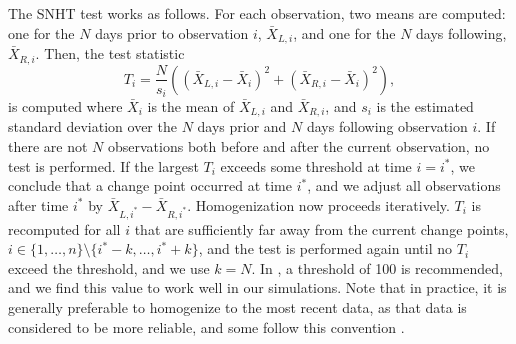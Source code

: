 \documentclass[12pt]{article}
\def\ni{\noindent}
\begin{document}
\begin{doublespacing}
The SNHT test works as follows.  For each observation, two means are computed: one for the $N$ days prior to observation $i$, $\bar{X}_{L,i}$, and one for the $N$ days following, $\bar{X}_{R,i}$.  Then, the test statistic
\begin{equation}
	T_i = \frac{N}{s_i}\left( (\bar{X}_{L,i}-\bar{X}_i)^2 + (\bar{X}_{R,i}-\bar{X}_i)^2\right),
	\label{eq:Hom}
\end{equation}
\ni is computed where $\bar{X}_i$ is the mean of $\bar{X}_{L,i}$ and $\bar{X}_{R,i}$, and $s_i$ is the estimated standard deviation over the $N$ days prior and $N$ days following observation $i$.  If there are not $N$ observations both before and after the current observation, no test is performed.  If the largest $T_i$ exceeds some threshold at time $i=i^*$, we conclude that a change point occurred at time $i^*$, and we adjust all observations after time $i^*$ by $\bar{X}_{L,i^*}-\bar{X}_{R,i^*}$.  Homogenization now proceeds iteratively.  $T_i$ is recomputed for all $i$ that are sufficiently far away from the current change points, $i\in\{1,\ldots,n\} \setminus \{i^*-k, \ldots, i^*+k\}$, and the test is performed again until no $T_i$ exceed the threshold, and we use $k=N$.  In \cite{haimberger07}, a threshold of 100 is recommended, and we find this value to work well in our simulations.  Note that in practice, it is generally preferable to homogenize to the most recent data, as that data is considered to be more reliable, and some follow this convention \cite{domonkos13}. %


\end{doublespacing}
\end{document}
